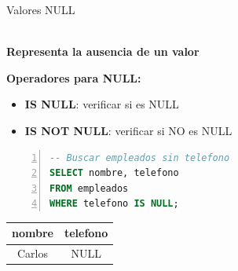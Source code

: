 \documentclass{beamer}
\begin{document}
\begin{frame}[fragile]{Valores NULL}
    \begin{center}
        {\Large \faQuestionCircle}\\[0.2cm]
        \textbf{Representa la ausencia de un valor}
    \end{center}
    
    \vspace{0.3cm}
    
    \textbf{Operadores para NULL:}
    \begin{itemize}
        \item[{\makebox[1em][c]{\textcolor{black}{\faCheck}}}] \textbf{IS NULL}: verificar si es NULL
        \item[{\makebox[1em][c]{\textcolor{black}{\faTimes}}}] \textbf{IS NOT NULL}: verificar si NO es NULL
    \end{itemize}
    
    \vspace{0.3cm}
    
    \begin{lstlisting}[language=SQL, numbers=left, numbersep=5pt]
-- Buscar empleados sin telefono
SELECT nombre, telefono
FROM empleados
WHERE telefono IS NULL;
    \end{lstlisting}
    
    \vspace{0.3cm}
    
    \begin{center}
        \begin{tabular}{cc}
            \toprule
            nombre & telefono \\
            \midrule
            Carlos & NULL \\
            \bottomrule
        \end{tabular}
    \end{center}
\end{frame}
\end{document}
